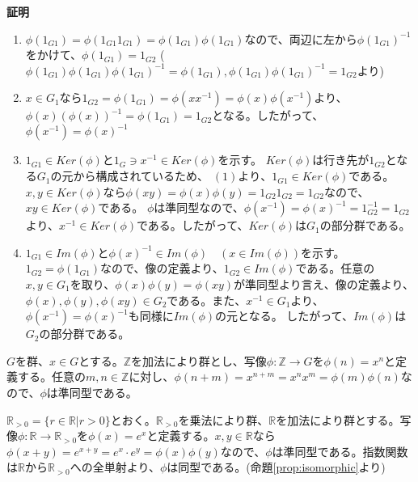 \documentclass[dvipdfmx,autodetect-engine]{jsarticle}
\begin{document}
{\bf 証明}
\begin{enumerate}
\renewcommand{\labelenumi}{(\arabic{enumi})}
\item $\phi(1_{G1}) = \phi(1_{G1} 1_{G1}) = \phi(1_{G1})\phi(1_{G1})$なので、両辺に左から$\phi(1_{G1})^{-1}$をかけて、$\phi(1_{G1}) = 1_{G2}$ ($\phi(1_{G1})\phi(1_{G1})\phi(1_{G1})^{-1} = \phi(1_{G1}), \phi(1_{G1})\phi(1_{G1})^{-1} = 1_{G2}$より)

\item $x \in G_1$なら$1_{G2} = \phi(1_{G1}) = \phi(xx^{-1}) = \phi(x)\phi(x^{-1})$より、$\phi(x)(\phi(x))^{-1} = \phi(1_{G1}) = 1_{G2}$となる。したがって、$\phi(x^{-1}) = \phi(x)^{-1}$

\item $1_{G1} \in Ker(\phi)$と$1_G \ni x^{-1} \in Ker(\phi)$を示す。 $Ker(\phi)$は行き先が$1_{G2}$となる$G_1$の元から構成されているため、 $(1)より、1_{G1} \in Ker(\phi)$である。$x, y \in Ker(\phi)$なら$\phi(xy) = \phi(x)\phi(y) = 1_{G2}1_{G2} = 1_{G2}$なので、$xy \in Ker(\phi)$である。
$\phi$は準同型なので、$\phi(x^{-1}) = \phi(x)^{-1} = 1_{G2}^{-1} = 1_{G2}$より、$x^{-1} \in Ker(\phi)$である。したがって、$Ker(\phi)$は$G_1$の部分群である。

\item $1_{G1} \in Im(\phi)$と$\phi(x)^{-1} \in Im(\phi) \quad (x \in Im(\phi))$を示す。$1_{G2} = \phi(1_{G1})$なので、像の定義より、$1_{G2} \in Im(\phi)$である。任意の$x, y \in G_1$を取り、$\phi(x)\phi(y) = \phi(xy)$が準同型より言え、像の定義より、$\phi(x), \phi(y), \phi(xy) \in G_2$である。また、$x^{-1} \in G_1$より、$\phi(x^{-1}) = \phi(x)^{-1}$も同様に$Im(\phi)$の元となる。 したがって、$Im(\phi)$は$G_2$の部分群である。
\end{enumerate}

\exam $G$を群、$x \in G$とする。$\mathbb{Z}$を加法により群とし、写像$\phi: \mathbb{Z} \to G$を$\phi(n) = x^n$と定義する。任意の$m, n \in \mathbb{Z}$に対し、$\phi(n + m) = x^{n + m} = x^nx^m = \phi(m)\phi(n)$なので、$\phi$は準同型である。

\exam $\mathbb{R}_{>0} = \{r \in \mathbb{R} | r > 0\}$とおく。$\mathbb{R}_{>0}$を乗法により群、$\mathbb{R}$を加法により群とする。写像$\phi:\mathbb{R} \to \mathbb{R}_{>0}$を$\phi(x) = e^x$と定義する。$x, y \in \mathbb{R}$なら$\phi(x+y) = e^{x+y} = e^x \cdot e^y = \phi(x)\phi(y)$なので、$\phi$は準同型である。指数関数は$\mathbb{R}$から$\mathbb{R}_{>0}$への全単射より、$\phi$は同型である。(命題\ref{prop:isomorphic}より)


\label{prop:hommSingkeUnitKerAndInjective}
\end{document}
